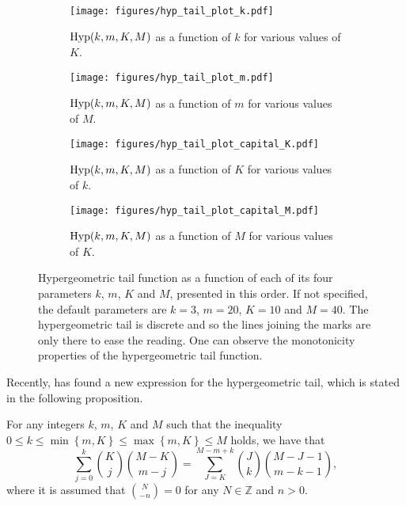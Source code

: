 \documentclass[twoside,11pt]{article}
\newcommand{\cb}[1]{\left\{#1\right\}}
\newcommand{\Hyp}{\textnormal{Hyp}}
\begin{document}
\begin{figure}[p]
\centering
\begin{subfigure}[t]{0.485\textwidth}
    \centering
    \texttt{[image: figures/hyp\_tail\_plot\_k.pdf]}
    \caption{$\Hyp(k,m,K,M)$ as a function of $k$ for various values of $K$.}
    \label{fig:hyp_tail_plot_k}
\end{subfigure}\hfill
\begin{subfigure}[t]{0.485\textwidth}
    \centering
    \texttt{[image: figures/hyp\_tail\_plot\_m.pdf]}
    \caption{$\Hyp(k,m,K,M)$ as a function of $m$ for various values of $M$.}
    \label{fig:hyp_tail_plot_m}
\end{subfigure}

\vspace{15pt}

\begin{subfigure}[t]{0.485\textwidth}
    \centering
    \texttt{[image: figures/hyp\_tail\_plot\_capital\_K.pdf]}
    \caption{$\Hyp(k,m,K,M)$ as a function of $K$ for various values of $k$.}
    \label{fig:hyp_tail_plot_K}
\end{subfigure}\hfill
\begin{subfigure}[t]{0.485\textwidth}
    \centering
    \texttt{[image: figures/hyp\_tail\_plot\_capital\_M.pdf]}
    \caption{$\Hyp(k,m,K,M)$ as a function of $M$ for various values of $K$.}
    \label{fig:hyp_tail_plot_M}
\end{subfigure}
\caption{Hypergeometric tail function as a function of each of its four parameters $k$, $m$, $K$ and $M$, presented in this order. If not specified, the default parameters are $k=3$, $m=20$, $K=10$ and $M=40$. The hypergeometric tail is discrete and so the lines joining the marks are only there to ease the reading. One can observe the monotonicity properties of the hypergeometric tail function.}
\label{fig:hyp_tail_plot}
\end{figure}

Recently, \cite{berkopec07} has found a new expression for the hypergeometric tail, which is stated in the following proposition.
\begin{proposition}\label{prop:berkopec}
For any integers $k$, $m$, $K$ and $M$ such that the inequality $0 \le k \le \min\cb{m,K} \le \max\cb{m,K} \le M$ holds, we have that
\begin{equation*}
    \sum_{j=0}^{k} \binom{K}{j} \binom{M-K}{m-j} = \sum_{J=K}^{M-m+k} \binom{J}{k} \binom{M-J-1}{m-k-1},
\end{equation*}
where it is assumed that $\binom{N}{-n} = 0$ for any $N \in \mathds{Z}$ and $n>0$.
\end{proposition}
\end{document}
